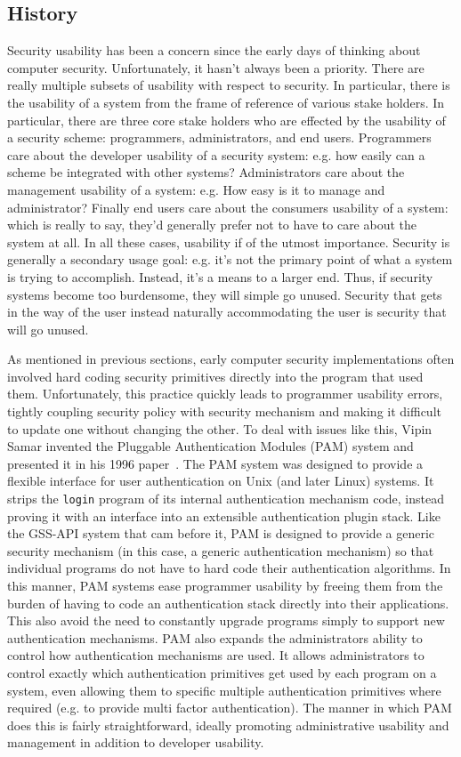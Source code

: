 \documentclass{sig-alternate}
\begin{document}
\subsection{History}

Security usability has been a concern since the early days of thinking
about computer security. Unfortunately, it hasn't always been a
priority. There are really multiple subsets of usability with respect
to security. In particular, there is the usability of a system from
the frame of reference of various stake holders. In particular, there
are three core stake holders who are effected by the usability of a
security scheme: programmers, administrators, and end
users. Programmers care about the developer usability of a security
system: e.g. how easily can a scheme be integrated with other systems?
Administrators care about the management usability of a system:
e.g. How easy is it to manage and administrator? Finally end users
care about the consumers usability of a system: which is really to
say, they'd generally prefer not to have to care about the system at
all. In all these cases, usability if of the utmost
importance. Security is generally a secondary usage goal: e.g. it's
not the primary point of what a system is trying to
accomplish. Instead, it's a means to a larger end. Thus, if security
systems become too burdensome, they will simple go unused. Security
that gets in the way of the user instead naturally accommodating the
user is security that will go unused.

As mentioned in previous sections, early computer security
implementations often involved hard coding security primitives
directly into the program that used them. Unfortunately, this practice
quickly leads to programmer usability errors, tightly coupling
security policy with security mechanism and making it difficult to
update one without changing the other. To deal with issues like this,
Vipin Samar invented the Pluggable Authentication Modules (PAM) system
and presented it in his 1996 paper~\cite{Samar1996}. The PAM system
was designed to provide a flexible interface for user authentication
on Unix (and later Linux) systems. It strips the \texttt{login}
program of its internal authentication mechanism code, instead proving
it with an interface into an extensible authentication plugin
stack. Like the GSS-API system that cam before it, PAM is designed to
provide a generic security mechanism (in this case, a generic
authentication mechanism) so that individual programs do not have to
hard code their authentication algorithms. In this manner, PAM systems
ease programmer usability by freeing them from the burden of having to
code an authentication stack directly into their applications. This
also avoid the need to constantly upgrade programs simply to support
new authentication mechanisms. PAM also expands the administrators
ability to control how authentication mechanisms are used. It allows
administrators to control exactly which authentication primitives get
used by each program on a system, even allowing them to specific
multiple authentication primitives where required (e.g. to provide
multi factor authentication). The manner in which PAM does this is
fairly straightforward, ideally promoting administrative usability and
management in addition to developer usability.
\end{document}
